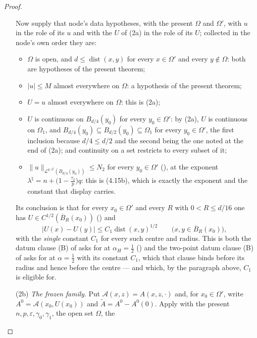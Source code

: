 \begin{proof}
\begin{enumerate}
  Now supply that node's data hypotheses, with the present $\Omega$ and
  $\Omega'$, with $u$ in the role of its $u$ and with the $U$ of (2a) in the
  role of its $U$; collected in the node's own order they are:
  \begin{itemize}
  \item $\Omega$ is open, and $d\le\operatorname{dist}(x,y)$ for every
    $x\in\Omega'$ and every $y\notin\Omega$: both are hypotheses of the present
    theorem;
  \item $|u|\le M$ almost everywhere on $\Omega$: a hypothesis of the present
    theorem;
  \item $U=u$ almost everywhere on $\Omega$: this is (2a);
  \item $U$ is continuous on $B_{d/4}(y_0)$ for every $y_0\in\Omega'$: by (2a),
    $U$ is continuous on $\Omega_1$, and
    $B_{d/4}(y_0)\subseteq B_{d/2}(y_0)\subseteq\Omega_1$ for every
    $y_0\in\Omega'$, the first inclusion because $d/4\le d/2$ and the second
    being the one noted at the end of (2a); and continuity on a set restricts
    to every subset of it;
  \item $\|u\|_{\mathcal L^{q,\lambda^\natural}(B_{d/4}(y_0))}\le N_2$ for every
    $y_0\in\Omega'$ (), at the exponent
    $\lambda^\natural=n+\bigl(1-\tfrac{\tau_2}p\bigr)q$: this is
    (4.15b), which is exactly the exponent and the constant that
    display carries.
  \end{itemize}
  Its conclusion is that for every $x_0\in\Omega'$ and every $R$ with
  $0<R\le d/16$ one has $U\in C^{1/2}(\overline B_R(x_0))$
  () and
  \[
  |U(x)-U(y)|\le C_1\operatorname{dist}(x,y)^{1/2}
  \qquad\bigl(x,y\in\overline B_R(x_0)\bigr),
  \]
  with the \emph{single} constant $C_1$ for every such centre and radius.  This
  is both the datum clause (B) of
   asks for at $\alpha_H=\tfrac12$
  () and the two-point datum clause (B) of
   asks for at $\alpha=\tfrac12$
  with its constant $C_1$, which that clause binds before its radius and hence
  before the centre --- and which, by the paragraph above, $C_1$ is eligible
  for.
\item[(2b)] \emph{The frozen family.}  Put $\mathcal A(x,z)=A(x,z,\cdot)$ and,
  for $x_0\in\Omega'$, write $A^0=\mathcal A(x_0,U(x_0))$ and
  $\widetilde A=A^0-A^0(0)$.  Apply  with
  the present $n,p,\varepsilon,\gamma_0,\gamma_1$, the open set $\Omega$, the

\end{enumerate}
\end{proof}
